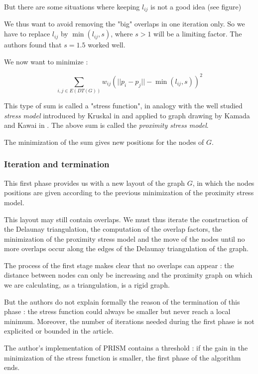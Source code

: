 \documentclass[12pt]{report}
\begin{document}
But there are some situations where keeping $l_{ij}$ is not a good idea (see figure) %

We thus want to avoid removing the "big" overlaps in one iteration only.
So we have to replace $l_{ij}$ by $\min(l_{ij},s)$, where $s > 1$ will be a limiting factor. The authors found that $s = 1.5$ worked well.

We now want to minimize :

\[ \sum_{i,j \in E(DT(G))} w_{ij}(||p_i - p_j|| - \min(l_{ij},s))^2\]

This type of sum is called a "stress function", in analogy with the well studied \emph{stress model} introduced by Kruskal in \cite{Kruskal64} and applied to graph drawing by Kamada and Kawai in \cite{Kamada89}. 
The above sum is called the \emph{proximity stress model}.

\bigskip
The minimization of the sum gives new positions for the nodes of $G$.

\subsubsection{Iteration and termination}
This first phase provides us with a new layout of the graph $G$, in which the nodes positions are given according to the previous minimization of the proximity stress model.

This layout may still contain overlaps. We must thus iterate the construction of the Delaunay triangulation, the computation of the overlap factors, the minimization of the proximity stress model and the move of the nodes until no more overlaps occur along the edges of the Delaunay triangulation of the graph.

\bigskip
The process of the first stage makes clear that no overlaps can appear : the distance between nodes can only be increasing and the proximity graph on which we are calculating, as a triangulation, is a rigid graph.

But the authors do not explain formally the reason of the termination of this phase : the stress function could always be smaller but never reach a local minimum. Moreover, the number of iterations needed during the first phase is not explicited or bounded in the article.

The author's implementation of PRISM contains a threshold : if the gain in the minimization of the stress function is smaller, the first phase of the algorithm ends.

\end{document}
